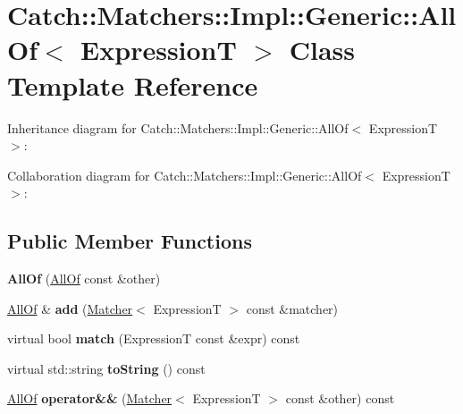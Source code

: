 \hypertarget{classCatch_1_1Matchers_1_1Impl_1_1Generic_1_1AllOf}{}\section{Catch\+:\+:Matchers\+:\+:Impl\+:\+:Generic\+:\+:All\+Of$<$ ExpressionT $>$ Class Template Reference}
\label{classCatch_1_1Matchers_1_1Impl_1_1Generic_1_1AllOf}


Inheritance diagram for Catch\+:\+:Matchers\+:\+:Impl\+:\+:Generic\+:\+:All\+Of$<$ ExpressionT $>$\+:


Collaboration diagram for Catch\+:\+:Matchers\+:\+:Impl\+:\+:Generic\+:\+:All\+Of$<$ ExpressionT $>$\+:
\subsection*{Public Member Functions}
\begin{DoxyCompactItemize}
\item 
{\bfseries All\+Of} (\hyperlink{classCatch_1_1Matchers_1_1Impl_1_1Generic_1_1AllOf}{All\+Of} const \&other)\hypertarget{classCatch_1_1Matchers_1_1Impl_1_1Generic_1_1AllOf_a31f7c5e570e79bdf64064ee87c331a59}{}\label{classCatch_1_1Matchers_1_1Impl_1_1Generic_1_1AllOf_a31f7c5e570e79bdf64064ee87c331a59}

\item 
\hyperlink{classCatch_1_1Matchers_1_1Impl_1_1Generic_1_1AllOf}{All\+Of} \& {\bfseries add} (\hyperlink{structCatch_1_1Matchers_1_1Impl_1_1Matcher}{Matcher}$<$ ExpressionT $>$ const \&matcher)\hypertarget{classCatch_1_1Matchers_1_1Impl_1_1Generic_1_1AllOf_a8c5cd1e494ab697076da418ee72ac297}{}\label{classCatch_1_1Matchers_1_1Impl_1_1Generic_1_1AllOf_a8c5cd1e494ab697076da418ee72ac297}

\item 
virtual bool {\bfseries match} (ExpressionT const \&expr) const \hypertarget{classCatch_1_1Matchers_1_1Impl_1_1Generic_1_1AllOf_a04534d0ac9e089f4500c3c19054f11ce}{}\label{classCatch_1_1Matchers_1_1Impl_1_1Generic_1_1AllOf_a04534d0ac9e089f4500c3c19054f11ce}

\item 
virtual std\+::string {\bfseries to\+String} () const \hypertarget{classCatch_1_1Matchers_1_1Impl_1_1Generic_1_1AllOf_a9febc1e67acbeff62a32bcbfdc0c8fab}{}\label{classCatch_1_1Matchers_1_1Impl_1_1Generic_1_1AllOf_a9febc1e67acbeff62a32bcbfdc0c8fab}

\item 
\hyperlink{classCatch_1_1Matchers_1_1Impl_1_1Generic_1_1AllOf}{All\+Of} {\bfseries operator\&\&} (\hyperlink{structCatch_1_1Matchers_1_1Impl_1_1Matcher}{Matcher}$<$ ExpressionT $>$ const \&other) const \hypertarget{classCatch_1_1Matchers_1_1Impl_1_1Generic_1_1AllOf_ac2b4045ae39746852a0f603715ba1387}{}\label{classCatch_1_1Matchers_1_1Impl_1_1Generic_1_1AllOf_ac2b4045ae39746852a0f603715ba1387}

\end{DoxyCompactItemize}
